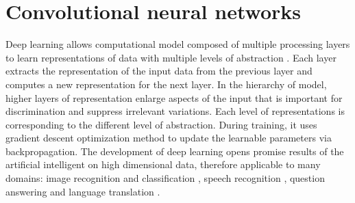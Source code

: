 \documentclass[conference]{IEEEtran}
\begin{document}
\section{Convolutional neural networks}
Deep learning allows computational model composed of multiple processing layers to learn representations of data with multiple levels of abstraction \cite{lecun2015deep}. Each layer extracts the representation of the input data from the previous layer and computes a new representation for the next layer. In the hierarchy of model, higher layers of representation enlarge aspects of the input that is important for discrimination and suppress irrelevant variations. Each level of representations is corresponding to the different level of abstraction. During training, it uses gradient descent optimization method to update the learnable parameters via backpropagation. The development of deep learning opens promise results of the artificial intelligent on high dimensional data, therefore applicable to many domains: image recognition and classification \cite{krizhevsky2012imagenet,ciregan2012multi,szegedy2015going}, speech recognition \cite{mikolov2011strategies,hinton2012deep,sainath2013deep}, question answering \cite{bordes2014question} and language translation \cite{sutskever2014sequence} \cite{jean2014using}.
\end{document}
